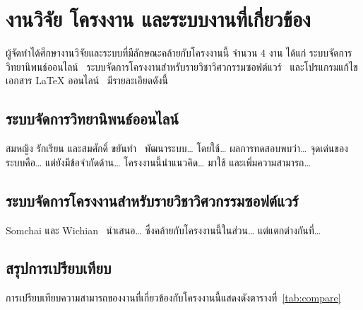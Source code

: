 %

\section{งานวิจัย โครงงาน และระบบงานที่เกี่ยวข้อง}
\label{sec:related}


ผู้จัดทำได้ศึกษางานวิจัยและระบบที่มีลักษณะคล้ายกับโครงงานนี้ จำนวน 4 งาน
ได้แก่ ระบบจัดการวิทยานิพนธ์ออนไลน์~\cite{thesismgmt2023}
ระบบจัดการโครงงานสำหรับรายวิชาวิศวกรรมซอฟต์แวร์~\cite{projmgmt2023}
และโปรแกรมแก้ไขเอกสาร \LaTeX{} ออนไลน์~\cite{overleaf2024,swiftlatex2019}
มีรายละเอียดดังนี้

\subsection{ระบบจัดการวิทยานิพนธ์ออนไลน์}

สมหญิง รักเรียน และสมศักดิ์ ขยันทำ~\cite{thesismgmt2023} พัฒนาระบบ\ldots{}
โดยใช้\ldots{} ผลการทดสอบพบว่า\ldots{}
จุดเด่นของระบบคือ\ldots{} แต่ยังมีข้อจำกัดด้าน\ldots{}
โครงงานนี้นำแนวคิด\ldots{} มาใช้ และเพิ่มความสามารถ\ldots{}

\subsection{ระบบจัดการโครงงานสำหรับรายวิชาวิศวกรรมซอฟต์แวร์}

Somchai และ Wichian~\cite{projmgmt2023} นำเสนอ\ldots{}
ซึ่งคล้ายกับโครงงานนี้ในส่วน\ldots{} แต่แตกต่างกันที่\ldots{}

\subsection{สรุปการเปรียบเทียบ}

การเปรียบเทียบความสามารถของงานที่เกี่ยวข้องกับโครงงานนี้แสดงดังตารางที่~\ref{tab:compare}

